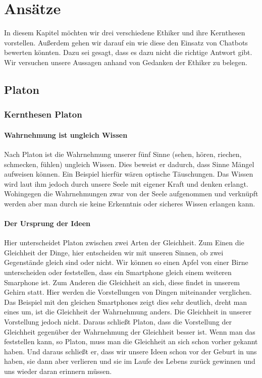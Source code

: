 \section{Ansätze}
In diesem Kapitel möchten wir drei verschiedene Ethiker und ihre Kernthesen vorstellen. Außerdem gehen wir darauf ein wie diese den Einsatz von Chatbots bewerten könnten. Dazu sei gesagt, dass es dazu nicht die richtige Antwort gibt. Wir versuchen unsere Aussagen anhand von Gedanken der Ethiker zu belegen. 

\subsection{Platon}

\subsubsection{Kernthesen Platon}

\paragraph{Wahrnehmung ist ungleich Wissen} 
Nach Platon ist die Wahrnehmung unserer fünf Sinne (sehen, hören, riechen, schmecken, fühlen) ungleich Wissen. Dies beweist er dadurch, dass Sinne Mängel aufweisen können. Ein Beispiel hierfür wären optische Täuschungen. Das Wissen wird laut ihm jedoch durch unsere Seele mit eigener Kraft  und denken erlangt. Wohingegen die Wahrnehmungen zwar von der Seele aufgenommen und verknüpft werden aber man durch sie keine Erkenntnis oder sicheres Wissen  erlangen kann.

\paragraph{Der Ursprung der Ideen} 
Hier unterscheidet Platon zwischen zwei Arten der Gleichheit.\newline
Zum Einen die Gleichheit der Dinge, hier entscheiden wir mit unseren Sinnen, ob zwei Gegenstände gleich sind oder nicht. Wir können so einen Apfel von einer Birne unterscheiden oder feststellen, dass ein Smartphone gleich einem weiteren Smarphone ist.\newline
Zum Anderen die Gleichheit an sich, diese findet in unserem Gehirn statt. Hier werden die Vorstellungen von Dingen miteinander verglichen.\newline
Das Beispiel mit den gleichen Smartphones zeigt dies sehr deutlich, dreht man eines um, ist die Gleichheit der Wahrnehmung anders. Die Gleichheit in unserer Vorstellung jedoch nicht. Daraus schließt Platon, dass die Vorstellung der Gleichheit gegenüber der Wahrnehmung der Gleichheit besser ist. Wenn man das feststellen kann, so Platon, muss man die Gleichheit an sich schon vorher gekannt haben. Und daraus schließt er, dass wir unsere Ideen schon vor der Geburt in uns haben, sie dann aber verlieren und sie im Laufe des Lebens zurück gewinnen und uns wieder daran erinnern müssen.

